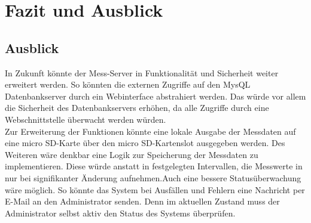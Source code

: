 \chapter{Fazit und Ausblick}
\label{chapter_FazitUndAusblick}


\section{Ausblick}

In Zukunft könnte der Mess-Server in Funktionalität und Sicherheit weiter erweitert werden. So könnten die externen Zugriffe auf den MysQL Datenbankserver durch ein Webinterface abstrahiert werden. Das würde vor allem die Sicherheit des Datenbankservers erhöhen, da alle Zugriffe durch eine Webschnittstelle überwacht werden würden.\\
Zur Erweiterung der Funktionen könnte eine lokale Ausgabe der Messdaten auf eine micro SD-Karte über den micro SD-Kartenslot ausgegeben werden. Des Weiteren wäre denkbar eine Logik zur Speicherung der Messdaten zu implementieren. Diese würde anstatt in festgelegten Intervallen, die Messwerte in nur bei signifikanter Änderung aufnehmen.Auch eine bessere Statusüberwachung wäre möglich. So könnte das System bei Ausfällen und Fehlern eine Nachricht per E-Mail an den Administrator senden. Denn im aktuellen Zustand muss der Administrator selbst aktiv den Status des Systems überprüfen.